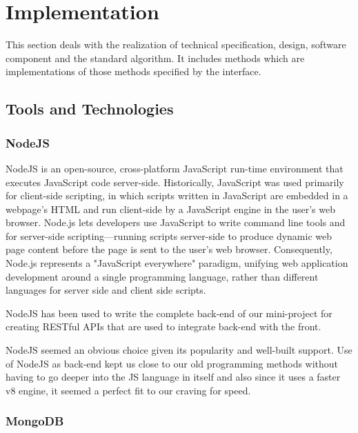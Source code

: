 \chapter{Implementation}
This section deals with the realization of technical specification, design, software component and the standard algorithm. It includes methods which are implementations of those methods specified by the interface.


\section{Tools and Technologies}

\subsection{NodeJS}

NodeJS\cite{NodeJS} is an open-source, cross-platform JavaScript run-time environment that executes JavaScript code server-side. Historically, JavaScript was used primarily for client-side scripting, in which scripts written in JavaScript are embedded in a webpage's HTML and run client-side by a JavaScript engine in the user's web browser. Node.js lets developers use JavaScript to write command line tools and for server-side scripting—running scripts server-side to produce dynamic web page content before the page is sent to the user's web browser. Consequently, Node.js represents a "JavaScript everywhere" paradigm, unifying web application development around a single programming language, rather than different languages for server side and client side scripts. 

NodeJS has been used to write the complete back-end of our mini-project for creating RESTful APIs that are used to integrate back-end with the front.  

NodeJS seemed an obvious choice given its popularity and well-built support. Use of NodeJS as back-end kept us close to our old programming methods without having to go deeper into the JS language in itself and also since it uses a faster v8 engine, it seemed a perfect fit to our craving for speed. 

\subsection{MongoDB}

